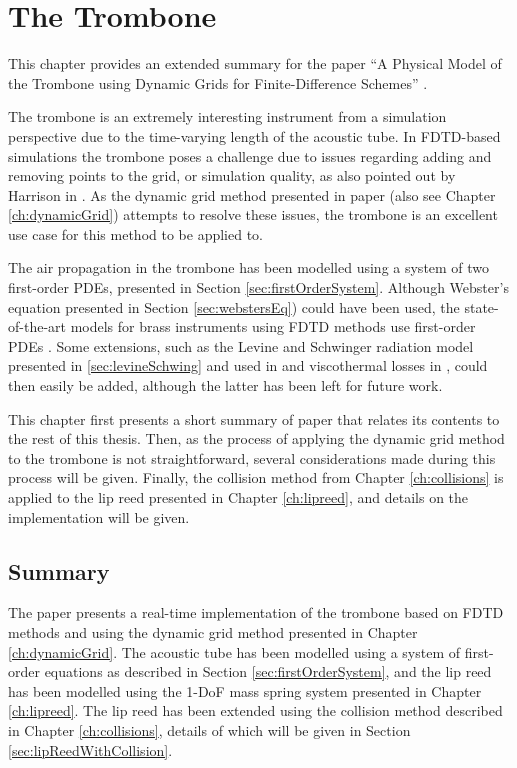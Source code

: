 \chapter{The Trombone}\label{ch:trombone}
This chapter provides an extended summary for the paper ``A Physical Model of the Trombone using Dynamic Grids for Finite-Difference Schemes'' \citeP[H]. 

The trombone is an extremely interesting instrument from a simulation perspective due to the time-varying length of the acoustic tube. In FDTD-based simulations the trombone poses a challenge due to issues regarding adding and removing points to the grid, or simulation quality, as also pointed out by Harrison in \cite{Harrison2018}. As the dynamic grid method presented in paper \citeP[G] (also see Chapter \ref{ch:dynamicGrid}) attempts to resolve these issues, the trombone is an excellent use case for this method to be applied to. 

The air propagation in the trombone has been modelled using a system of two first-order PDEs, presented in Section \ref{sec:firstOrderSystem}. Although Webster's equation presented in Section \ref{sec:webstersEq}) could have been used, the state-of-the-art models for brass instruments using FDTD methods use first-order PDEs \cite{Bilbao2016, Harrison2018}. Some extensions, such as the Levine and Schwinger radiation model presented in \ref{sec:levineSchwing} and used in \cite{Harrison2018} and viscothermal losses in \cite{Bilbao2016}, could then easily be added, although the latter has been left for future work.

This chapter first presents a short summary of paper \citeP[H] that relates its contents to the rest of this thesis. Then, as the process of applying the dynamic grid method to the trombone is not straightforward, several considerations made during this process will be given. Finally, the collision method from Chapter \ref{ch:collisions} is applied to the lip reed presented in Chapter \ref{ch:lipreed},
and details on the implementation will be given. 


\section{Summary}
The paper presents a real-time implementation of the trombone based on FDTD methods and using the dynamic grid method presented in Chapter \ref{ch:dynamicGrid}. The acoustic tube has been modelled using a system of first-order equations as described in Section \ref{sec:firstOrderSystem}, and the lip reed has been modelled using the 1-DoF mass spring system presented in Chapter \ref{ch:lipreed}. The lip reed has been extended using the collision method described in Chapter \ref{ch:collisions}, details of which will be given in Section \ref{sec:lipReedWithCollision}. 

